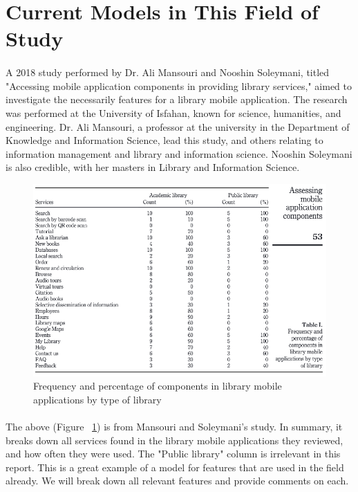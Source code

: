     
\section{Current Models in This Field of Study}
    \paragraph{}
    A 2018 study performed by Dr. Ali Mansouri and Nooshin Soleymani, titled "Accessing mobile application components in providing library services," aimed to investigate the necessarily features for a library mobile application. The research was performed at the University of Isfahan, known for science, humanities, and engineering. Dr. Ali Mansouri, a professor at the university in the Department of Knowledge and Information Science, lead this study, and others relating to information management and library and information science. Nooshin Soleymani is also credible, with her masters in Library and Information Science.
    \begin{figure}[H]
        \centering
        \includegraphics[width = \textwidth, height = \textheight, keepaspectratio]{assets/img/accessing_mobile_application_components_table_1.png}
        \caption{Frequency and percentage of components in library mobile applications by type of library \protect{}}
        \label{fig:freq_and_per_comp_lib_mob_app}
    \end{figure}
    \paragraph{}
    The above (Figure ~\ref{fig:freq_and_per_comp_lib_mob_app}) is from Mansouri and Soleymani's study. In summary, it breaks down all services found in the library mobile applications they reviewed, and how often they were used. The "Public library" column is irrelevant in this report. This is a great example of a model for features that are used in the field already. We will break down all relevant features and provide comments on each.
